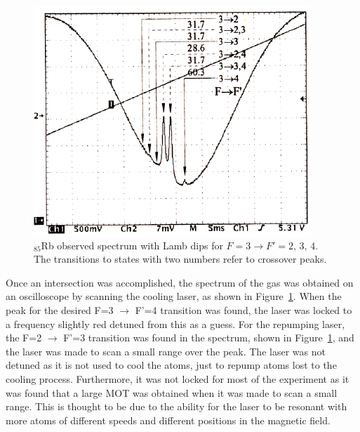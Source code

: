 \documentclass[twocolumn]{article}
\begin{document}
\begin{figure} [!h]
	\centering
	\includegraphics[width=1\linewidth]{Images/Peaks.png}
	\caption{$_{85}$Rb observed spectrum with Lamb dips for $F = 3 \rightarrow F' = 2, \, 3, \, 4$. The transitions to states with two numbers refer to crossover peaks.\cite{manual}}
	\label{fig:Peaks}
\end{figure}
\par Once an intersection was accomplished, the spectrum of the gas was obtained on an oscilloscope by scanning the cooling laser, as shown in Figure~\ref{fig:Peaks}. When the peak for the desired F=3 $\to$ F'=4 transition was found, the laser was locked to a frequency slightly red detuned from this as a guess. For the repumping laser, the F=2 $\to$ F'=3 transition was found in the spectrum, shown in Figure~\ref{fig:Peaks}, and the laser was made to scan a small range over the peak. The laser was not detuned as it is not used to cool the atoms, just to repump atoms lost to the cooling process. Furthermore, it was not locked for most of the experiment as it was found that a large MOT was obtained when it was made to scan a small range. This is thought to be due to the ability for the laser to be resonant with more atoms of different speeds and different positions in the magnetic field. 
\end{document}

